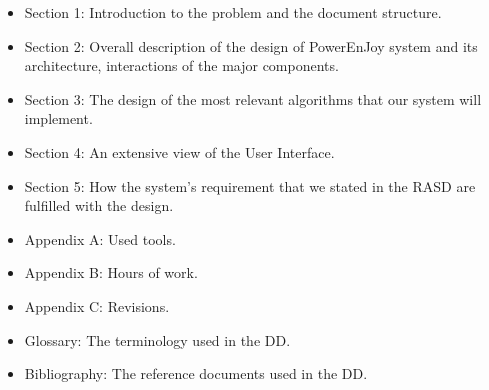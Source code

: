\begin{itemize}

\item Section 1: Introduction to the problem and the document structure.
\item Section 2: Overall description of the design of PowerEnJoy system and its architecture,  interactions of the major components.
\item Section 3: The design of the most relevant algorithms that our system will implement.
\item Section 4: An extensive view of the User Interface.
\item Section 5: How the system's requirement that we stated in the RASD are fulfilled with the design.
\item Appendix A: Used tools.
\item Appendix B: Hours of work.
\item Appendix C: Revisions.
\item Glossary: The terminology used in the DD.
\item Bibliography: The reference documents used in the DD.

\end{itemize}